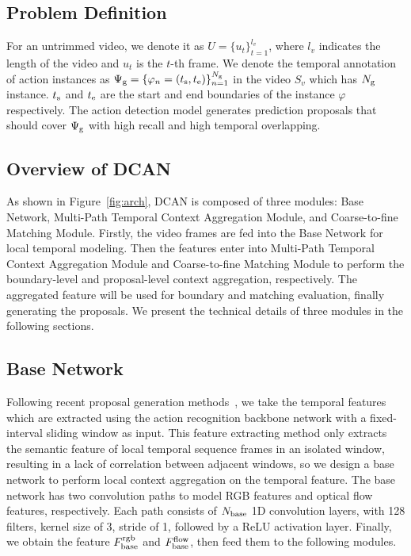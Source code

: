 \documentclass[letterpaper]{article} \usepackage{aaai22}  \usepackage{times}  \usepackage{helvet}  \usepackage{courier}  \usepackage[hyphens]{url}  \usepackage{graphicx} \urlstyle{rm} \def\UrlFont{\rm}  \usepackage{natbib}  \usepackage{caption} \DeclareCaptionStyle{ruled}{labelfont=normalfont,labelsep=colon,strut=off} \frenchspacing  \setlength{\pdfpagewidth}{8.5in}  \setlength{\pdfpageheight}{11in}  \usepackage{algorithm}
\begin{document}
\subsection{Problem Definition}
For an untrimmed video, we denote it as $U=\{u_t\}^{l_{v}}_{t=1}$, where $l_v$ indicates the length of the video and  $u_t$ is the $t$-th frame. We denote the temporal annotation of action instances as $\Psi_{\rm g}=\{\varphi_n=(t_{\rm s},t_{\rm e})\}^{N_{\rm g}}_{n=1}$ in the video $S_v$ which has  $N_{\rm g}$ instance. $t_{\rm s}$ and $t_{\rm e}$ are the start and end boundaries of the instance $\varphi$ respectively. The action detection model generates prediction proposals that should cover $\Psi_{\rm g}$ with high recall and high temporal overlapping.

\subsection{Overview of DCAN}
As shown in Figure~\ref{fig:arch}, DCAN is composed of three modules: Base Network, Multi-Path Temporal Context Aggregation Module, and Coarse-to-fine Matching Module. 
Firstly, the video frames are fed into the Base Network for local temporal modeling. 
Then the features enter into Multi-Path Temporal Context Aggregation Module and Coarse-to-fine Matching Module to perform the boundary-level and proposal-level context aggregation, respectively. 
The aggregated feature will be used for boundary and matching evaluation, finally generating the proposals. 
We present the technical details of three modules in the following sections.


\subsection{Base Network} 







Following recent proposal generation methods~\cite{bsn,bmn}, we take the temporal features which are extracted using the action recognition backbone network with a fixed-interval sliding window as input.
This feature extracting method only extracts the semantic feature of local temporal sequence frames in an isolated window, resulting in a lack of correlation between adjacent windows, so we design a base network to perform local context aggregation on the temporal feature.
The base network has two convolution paths to model RGB features and optical flow features, respectively.
Each path consists of $N_{\rm base}$ 1D convolution layers, with 128 filters, kernel size of 3, stride of 1, followed by a ReLU activation layer.
Finally, we obtain the feature $F_{\rm base}^{\rm rgb}$ and $F_{\rm base}^{\rm flow}$, then feed them to the following modules.
\end{document}
